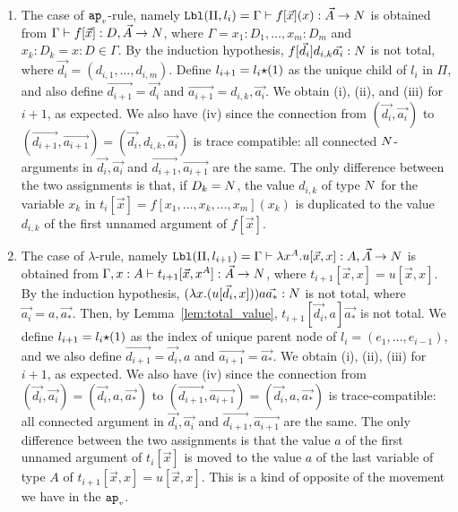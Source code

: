 \documentclass{article}
\newenvironment{proof}[1][Proof]{\begin{trivlist}
\item[\hskip \labelsep {\bfseries #1}]}{\end{trivlist}}
\begin{document}
\begin{proof}
\begin{enumerate}
\item
  The case of ${{\tt ap}_{\mbox{\tiny $v$}}}$-rule, namely 
  ${\tt Lbl}(\Pi,l_i) 
  = 
  \Gamma \vdash f[\vec{x}](x): \vec{A}\rightarrow{N}$ is obtained from
  $\Gamma \vdash f[\vec{x}]: D,\vec{A} \rightarrow {N}$,
  where $\Gamma=x_1:D_1,\ldots,x_m:D_m$ and $x_k:D_k = x:D\in\Gamma$. 
  By the induction hypothesis, $f[\vec{d_i}]d_{i,k}\vec{a_i}:{N}$ is not total,
  where $\vec{d_i} = (d_{i,1},\ldots,d_{i,m})$. 
  Define $l_{i+1}=l_i{\star}(1)$ as the unique child of $l_i$ in $\Pi$, and
  also define $\vec{d_{i+1}} = \vec{d_i}$ and $\vec{a_{i+1}} = d_{i,k},\vec{a_i}$. 
  We obtain (i), (ii), and (iii) for $i+1$, as expected.
  We also have (iv) since the connection from
  $(\vec{d_i},\vec{a_i})$ to
  $(\vec{d_{i+1}},\vec{a_{i+1}}) = (\vec{d_i},d_{i,k},\vec{a_i})$
  is trace compatible: all connected ${N}$-arguments in $\vec{d_i},\vec{a_i}$ and 
  $\vec{d_{i+1}},\vec{a_{i+1}}$ are the same.  
  The only difference between the two assignments
  is that, if $D_k = {N}$, the value $d_{i,k}$ of type ${N}$ for the variable $x_k$
  in $t_i[\vec{x}]=f[x_1,\ldots,x_k,\ldots,x_m](x_k)$ is duplicated to the value $d_{i,k}$ 
  of the first unnamed argument of $ f[\vec{x}]$. 

\item
  The case of $\lambda$-rule, namely
  ${\tt Lbl}(\Pi,l_{i+1}) = 
    \Gamma\vdash \lambda x^A.u[\vec{x},x] : A, \vec{A} \rightarrow {N}$ is obtained from
  $\Gamma,x:A\vdash t_{i+1}[\vec{x},x^A]:\vec{A}\rightarrow{N}$, 
  where $t_{i+1}[\vec{x},x]=u[\vec{x},x]$.
  By the induction hypothesis, $(\lambda x.(u[\vec{d_i},x]))a\vec{a_*}:{N}$ is not total,
  where $\vec{a_i} = a,\vec{a_*}$.
  Then, by Lemma~\ref{lem:total_value}, $t_{i+1}[\vec{d_i},a]\vec{a_*}$ is not total. 
  We define $l_{i+1} = l_i {\star} (1)$ as the index of unique parent node of $l_{i}=(e_1,\ldots,e_{i-1})$,
  and we also define $\vec{d_{i+1}} = \vec{d_i},a$ and $\vec{a_{i+1}} = \vec{a_*}$. 
  We obtain (i), (ii), (iii) for $i+1$, as expected.
  We also have (iv) since the connection from 
  $(\vec{d_i},\vec{a_i}) = (\vec{d_i},a,\vec{a_*})$ 
  to $(\vec{d_{i+1}},\vec{a_{i+1}}) = (\vec{d_i},a,\vec{a_*})$
  is trace-compatible: all connected argument in $\vec{d_i},\vec{a_i}$ and 
  $\vec{d_{i+1}},\vec{a_{i+1}}$ are the same. The only difference between the two assignments
  is that the value $a$ of the first unnamed argument of $t_i[\vec{x}]$ is moved to the value $a$
  of the last variable of type $A$ of $t_{i+1}[\vec{x},x]=u[\vec{x},x]$.
  This is a kind of opposite of the movement we have in the ${{\tt ap}_{\mbox{\tiny $v$}}}$.


\end{enumerate}
\end{proof}
\end{document}
